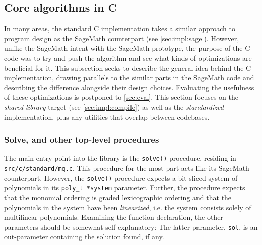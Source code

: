 \subsection{Core algorithms in C} \label{sec:impl:c}

In many areas, the standard C implementation takes a similar approach to program design as the SageMath counterpart (see \cref{sec:impl:sage}). However, unlike the SageMath intent with the SageMath prototype, the purpose of the C code was to try and push the algorithm and see what kinds of optimizations are beneficial for it. This subsection seeks to describe the general idea behind the C implementation, drawing parallels to the similar parts in the SageMath code and describing the difference alongside their design choices. Evaluating the usefulness of these optimizations is postponed to \cref{sec:eval}. This section focuses on the \textit{shared library} target (see \cref{sec:impl:compile}) as well as the \textit{standardized} implementation, plus any utilities that overlap between codebases.

\subsubsection{Solve, and other top-level procedures} \label{sec:impl:c:solve}
The main entry point into the library is the \texttt{solve()} procedure, residing in \texttt{src/c/standard/mq.c}. This procedure for the most part acts like its SageMath counterpart. However, the \texttt{solve()} procedure expects a bit-sliced system of polynomials in its \texttt{poly\_t *system} parameter. Further, the procedure expects that the monomial ordering is graded lexicographic ordering and that the polynomials in the system have been \textit{linearized}, i.e. the system consists solely of multilinear polynomials. Examining the function declaration, the other parameters should be somewhat self-explanatory:
The latter parameter, \texttt{sol}, is an out-parameter containing the solution found, if any.

